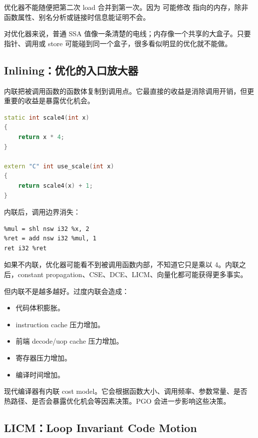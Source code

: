 优化器不能随便把第二次 load 合并到第一次。因为  可能修改  指向的内存，除非函数属性、别名分析或链接时信息能证明不会。

\begin{mentalmodel}
对优化器来说，普通 SSA 值像一条清楚的电线；内存像一个共享的大盒子。只要指针、调用或 store 可能碰到同一个盒子，很多看似明显的优化就不能做。
\end{mentalmodel}

\subsection{Inlining：优化的入口放大器}

内联把被调用函数的函数体复制到调用点。它最直接的收益是消除调用开销，但更重要的收益是暴露优化机会。

\begin{lstlisting}[language=C++]
static int scale4(int x)
{
    return x * 4;
}

extern "C" int use_scale(int x)
{
    return scale4(x) + 1;
}
\end{lstlisting}

内联后，调用边界消失：

\begin{lstlisting}
%mul = shl nsw i32 %x, 2
%ret = add nsw i32 %mul, 1
ret i32 %ret
\end{lstlisting}

如果不内联，优化器可能看不到被调用函数内部，不知道它只是乘以 4。内联之后，constant propagation、CSE、DCE、LICM、向量化都可能获得更多事实。

但内联不是越多越好。过度内联会造成：

\begin{itemize}
  \item 代码体积膨胀。
  \item instruction cache 压力增加。
  \item 前端 decode/uop cache 压力增加。
  \item 寄存器压力增加。
  \item 编译时间增加。
\end{itemize}

现代编译器有内联 cost model。它会根据函数大小、调用频率、参数常量、是否热路径、是否会暴露优化机会等因素决策。PGO 会进一步影响这些决策。

\subsection{LICM：Loop Invariant Code Motion}

